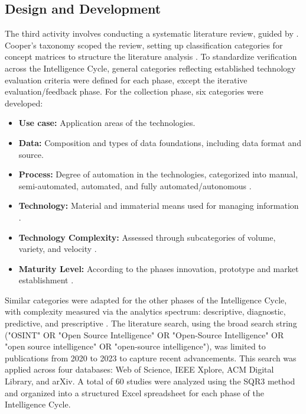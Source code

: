 \documentclass[10pt]{article}
\begin{document}
\subsection{Design and Development}
The third activity involves conducting a systematic literature review, guided by \cite{Cleven.2009}. Cooper's taxonomy \cite{Cooper.1988} scoped the review, setting up classification categories for concept matrices to structure the literature analysis \cite{Webster.2002}.
To standardize verification across the Intelligence Cycle, general categories reflecting established technology evaluation criteria were defined for each phase, except the iterative evaluation/feedback phase. For the collection phase, six categories were developed:
\begin{itemize}
    \item \textbf{Use case:} Application areas of the technologies.
    \item \textbf{Data:} Composition and types of data foundations, including data format and source.
    \item \textbf{Process:} Degree of automation in the technologies, categorized into manual, semi-automated, automated, and fully automated/autonomous \cite{Duncheon.2002, Billings.1997, Endsley.1999}.
    \item \textbf{Technology:} Material and immaterial means used for managing information \cite{Bleck.2004}.
    \item \textbf{Technology Complexity:} Assessed through subcategories of volume, variety, and velocity \cite{Elgendy.2014, Singh.2012}.
    \item \textbf{Maturity Level:} According to the phases innovation, prototype and  market establishment \cite{Stich.2022}.
\end{itemize}

Similar categories were adapted for the other phases of the Intelligence Cycle, with complexity measured via the analytics spectrum: descriptive, diagnostic, predictive, and prescriptive \cite{Delen.2013}.
The literature search, using the broad search string ("OSINT" OR "Open Source Intelligence" OR "Open-Source Intelligence" OR "open source intelligence" OR "open-source intelligence"), was limited to publications from 2020 to 2023 to capture recent advancements. This search was applied across four databases: Web of Science, IEEE Xplore, ACM Digital Library, and arXiv. A total of 60 studies were analyzed using the SQR3 method \cite{Robinson.1970} and organized into a structured Excel spreadsheet for each phase of the Intelligence Cycle.
\end{document}
